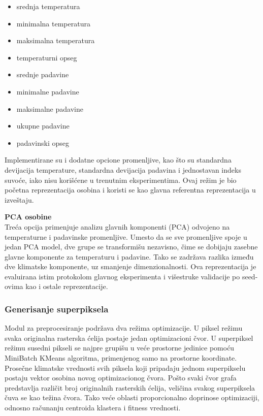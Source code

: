 \documentclass[11pt]{article}
\begin{document}
\begin{itemize}
  \item srednja temperatura
  \item minimalna temperatura
  \item maksimalna temperatura
  \item temperaturni opseg
  \item srednje padavine
  \item minimalne padavine
  \item maksimalne padavine
  \item ukupne padavine
  \item padavinski opseg
\end{itemize}

Implementirane su i dodatne opcione promenljive, kao što su standardna devijacija temperature, standardna devijacija padavina i jednostavan indeks suvoće, iako nisu korišćene u trenutnim eksperimentima. Ovaj režim je bio početna reprezentacija osobina i koristi se kao glavna referentna reprezentacija u izveštaju.

\textbf{PCA osobine} \\
Treća opcija primenjuje analizu glavnih komponenti (PCA) odvojeno na temperaturne i padavinske promenljive. Umesto da se sve promenljive spoje u jedan PCA model, dve grupe se transformišu nezavisno, čime se dobijaju zasebne glavne komponente za temperaturu i padavine. Tako se zadržava razlika između dve klimatske komponente, uz smanjenje dimenzionalnosti. Ova reprezentacija je evaluirana istim protokolom glavnog eksperimenta i višestruke validacije po seed-ovima kao i ostale reprezentacije.

\subsubsection{Generisanje superpiksela}
Modul za preprocesiranje podržava dva režima optimizacije. U piksel režimu svaka originalna rasterska ćelija postaje jedan optimizacioni čvor. U superpiksel režimu susedni pikseli se najpre grupišu u veće prostorne jedinice pomoću MiniBatch KMeans algoritma, primenjenog samo na prostorne koordinate. Prosečne klimatske vrednosti svih piksela koji pripadaju jednom superpikselu postaju vektor osobina novog optimizacionog čvora. Pošto svaki čvor grafa predstavlja različit broj originalnih rasterskih ćelija, veličina svakog superpiksela čuva se kao težina čvora. Tako veće oblasti proporcionalno doprinose optimizaciji, odnosno računanju centroida klastera i fitness vrednosti.
\end{document}
